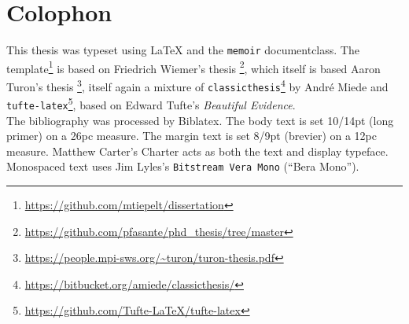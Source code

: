 
\pagestyle{empty}

\hfill

\vfill

\section*{Colophon}
%
\mparshift{40em} %
%
This thesis was typeset using \LaTeX{} and the \texttt{memoir} documentclass. 
The template\footnote{\url{https://github.com/mtiepelt/dissertation}} is based on Friedrich Wiemer's thesis \footnote{\url{https://github.com/pfasante/phd_thesis/tree/master}}, 
which itself is based Aaron Turon's thesis \footnote{\url{https://people.mpi-sws.org/~turon/turon-thesis.pdf}}, itself again a mixture of \texttt{classicthesis}\footnote{\url{https://bitbucket.org/amiede/classicthesis/}} by Andr\'e Miede and \texttt{tufte-latex}\footnote{\url{https://github.com/Tufte-LaTeX/tufte-latex}}, based on Edward Tufte's \emph{Beautiful Evidence}.\\[0.5\baselineskip]
%
The bibliography was processed by Biblatex.
%
The body text is set 10/14pt (long primer) on a 26pc measure.
The margin text is set 8/9pt (brevier) on a 12pc measure.
Matthew Carter's \textrm{Charter} acts as both the text and display typeface.
Monospaced text uses Jim Lyles's \texttt{Bitstream Vera Mono} (\enquote{Bera Mono}).\\[0.5\baselineskip]
%
